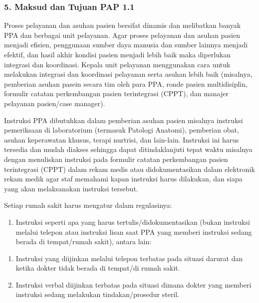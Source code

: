 \documentclass[
]{book}
\providecommand{\tightlist}{%
  \setlength{\itemsep}{0pt}\setlength{\parskip}{0pt}}
\begin{document}
\hypertarget{maksud-dan-tujuan-pap-1.1}{%
\subsubsection*{5. Maksud dan Tujuan PAP 1.1}\label{maksud-dan-tujuan-pap-1.1}}

Proses pelayanan dan asuhan pasien bersifat dinamis dan melibatkan banyak PPA dan berbagai unit pelayanan. Agar proses pelayanan dan asuhan pasien menjadi efisien, penggunaan sumber daya manusia dan sumber lainnya menjadi efektif, dan hasil akhir kondisi pasien menjadi lebih baik maka diperlukan integrasi dan koordinasi. Kepala unit pelayanan menggunakan cara untuk melakukan integrasi dan koordinasi pelayanan serta asuhan lebih baik (misalnya, pemberian asuhan pasein secara tim oleh para PPA, ronde pasien multidisiplin, formulir catatan perkembangan pasien terintegrasi (CPPT), dan manajer pelayanan pasien/case manager).

Instruksi PPA dibutuhkan dalam pemberian asuhan pasien misalnya instruksi pemeriksaan di laboratorium (termasuk Patologi Anatomi), pemberian obat, asuhan keperawatan khusus, terapi nurtrisi, dan lain-lain. Instruksi ini harus tersedia dan mudah diakses sehingga dapat ditindaklanjuti tepat waktu misalnya dengan menuliskan instruksi pada formulir catatan perkembangan pasien terintegrasi (CPPT) dalam rekam medis atau didokumentasikan dalam elektronik rekam medik agar staf memahami kapan instruksi harus dilakukan, dan siapa yang akan melaksanakan instruksi tersebut.

Setiap rumah sakit harus mengatur dalam regulasinya:

\begin{enumerate}
\def\labelenumi{\alph{enumi}.}
\tightlist
\item
  Instruksi seperti apa yang harus tertulis/didokumentasikan (bukan instruksi melalui telepon atau instruksi lisan saat PPA yang memberi instruksi sedang berada di tempat/rumah sakit), antara lain:
\end{enumerate}

\begin{enumerate}
\def\labelenumi{\arabic{enumi}.}
\tightlist
\item
  Instruksi yang diijinkan melalui telepon terbatas pada situasi darurat dan ketika dokter tidak berada di tempat/di rumah sakit.
\item
  Instruksi verbal diijinkan terbatas pada situasi dimana dokter yang memberi instruksi sedang melakukan tindakan/prosedur steril.
\end{enumerate}
\end{document}
